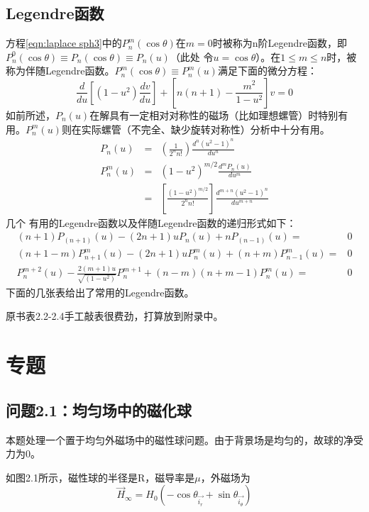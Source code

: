 \subsection{Legendre函数}
方程\ref{eqn:laplace sph3}中的$P_n^m(\cos\theta)$在$m=0$时被称为n阶Legendre函数，即$P_n^0(\cos\theta)\equiv P_n(\cos\theta)\equiv P_n(u)$（此处
令$u=\cos\theta$）。在$1\le m \le n$时，被称为伴随Legendre函数。$P_n^m(\cos\theta)\equiv P_n^m(u)$满足下面的微分方程：
\begin{equation}\label{eqn:legendre diff}
  \frac{d}{du}[(1-u^2)\frac{dv}{du}]+[n(n+1)-\frac{m^2}{1-u^2}]v=0
\end{equation}
如前所述，$P_n(u)$在解具有一定相对对称性的磁场（比如理想螺管）时特别有用。$P_n^m(u)$则在实际螺管（不完全、缺少旋转对称性）分析中十分有用。
\begin{eqnarray}\label{eqn:legendre function1}
P_n(u)&=&\left(\frac{1}{2^n n!}\right)\frac{d^n(u^2-1)^n}{du^n} \nonumber \\
P_n^m(u)&=&(1-u^2)^{m/2}\frac{d^mP_n(u)}{du^m}\nonumber\\
&=&\left[\frac{(1-u^2)^{m/2}}{2^n n!}\right]\frac{d^{m+n}(u^2-1)^n}{du^{m+n}}
\end{eqnarray}
几个 有用的Legendre函数以及伴随Legendre函数的递归形式如下：
\begin{eqnarray}\label{eqn:legendre function2}
(n+1)P_(n+1)(u)-(2n+1)uP_n(u)+nP_(n-1)(u)=&0 \nonumber \\
(n+1-m)P^m_{n+1}(u)-(2n+1)uP^m_n(u)+(n+m)P^m_{n-1}(u)=&0 \nonumber \\
P_n^{m+2}(u)-\frac{2(m+1)u}{\sqrt{(1-u^2)}}P_n^{m+1}+(n-m)(n+m-1)P_n^m(u)=&0
\end{eqnarray}
下面的几张表给出了常用的Legendre函数。

\textcolor[rgb]{1.00,0.00,0.00}{原书表2.2-2.4手工敲表很费劲，打算放到附录中。}

\section{专题}
\subsection{问题2.1：均匀场中的磁化球}
本题处理一个置于均匀外磁场中的磁性球问题。由于背景场是均匀的，故球的净受力为0。

如图2.1所示，磁性球的半径是R，磁导率是$\mu$，外磁场为
\begin{equation}\label{eqn:2.40}
  \vec{H}_\infty = H_0 (-\cos \theta_{\vec{i_r}}+\sin\theta_{\vec{i_\theta}})
\end{equation}

